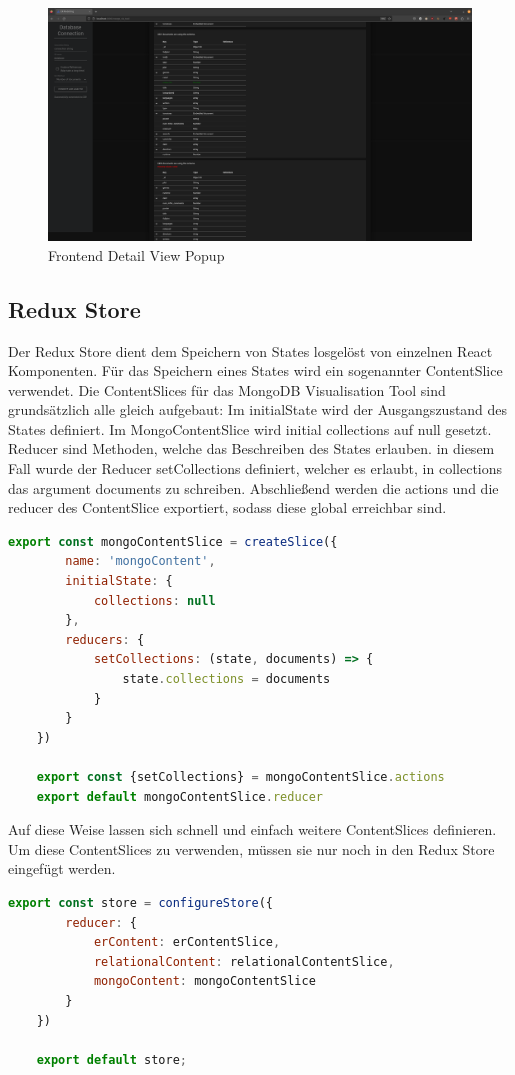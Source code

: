 \begin{figure}[H]
    \includegraphics[width=\textwidth]{images/frontend_detail_view}
    \caption{Frontend Detail View Popup}
    \label{fig:frontend_detail_view}
\end{figure}

\subsection{Redux Store}
\label{sub:fe_redux}

Der Redux Store dient dem Speichern von States losgelöst von einzelnen React Komponenten.
Für das Speichern eines States wird ein sogenannter ContentSlice verwendet.
Die ContentSlices für das MongoDB Visualisation Tool sind grundsätzlich alle gleich aufgebaut:
Im initialState wird der Ausgangszustand des States definiert. 
Im MongoContentSlice wird initial collections auf null gesetzt.
Reducer sind Methoden, welche das Beschreiben des States erlauben.
in diesem Fall wurde der Reducer setCollections definiert, welcher es erlaubt, in collections das argument documents zu schreiben.
Abschließend werden die actions und die reducer des ContentSlice exportiert, sodass diese global erreichbar sind.

\begin{lstlisting}[language=JavaScript, caption={MongoContentSlice},label={lst:fe_redux_slice}]
    export const mongoContentSlice = createSlice({
        name: 'mongoContent',
        initialState: {
            collections: null
        },
        reducers: {
            setCollections: (state, documents) => {
                state.collections = documents
            }
        }
    })

    export const {setCollections} = mongoContentSlice.actions
    export default mongoContentSlice.reducer
\end{lstlisting}

Auf diese Weise lassen sich schnell und einfach weitere ContentSlices definieren.
Um diese ContentSlices zu verwenden, müssen sie nur noch in den Redux Store eingefügt werden.

\begin{lstlisting}[language=JavaScript, caption={Redux Store},label={lst:fe_redux_store}]
    export const store = configureStore({
        reducer: {
            erContent: erContentSlice,
            relationalContent: relationalContentSlice,
            mongoContent: mongoContentSlice
        }
    })

    export default store;
\end{lstlisting}
